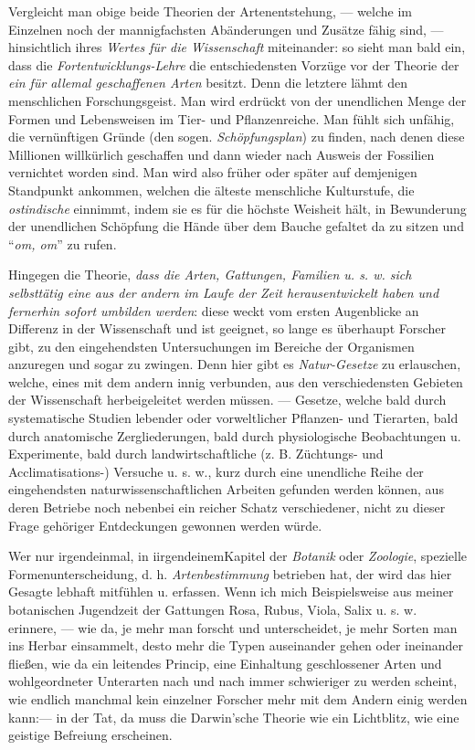 \documentclass[a4paper, 11pt, oneside, english]{article}
\begin{document}
Vergleicht man obige beide Theorien der Artenentstehung, --- welche im Einzelnen noch der mannigfachsten Abänderungen und Zusätze fähig sind, --- hinsichtlich ihres \emph{Wertes für die Wissenschaft} miteinander: so sieht man bald ein, dass die \emph{Fortentwicklungs-Lehre} die entschiedensten Vorzüge vor der Theorie der \emph{ein für allemal geschaffenen Arten} besitzt. Denn die letztere lähmt den menschlichen Forschungsgeist. Man wird erdrückt von der unendlichen Menge der Formen und Lebensweisen im Tier- und Pflanzenreiche. Man fühlt sich unfähig, die vernünftigen Gründe (den sogen. \emph{Schöpfungsplan}) zu finden, nach denen diese Millionen willkürlich geschaffen und dann wieder nach Ausweis der Fossilien vernichtet worden sind. Man wird also früher oder später auf demjenigen Standpunkt ankommen, welchen die älteste menschliche Kulturstufe, die \emph{ostindische} einnimmt, indem sie es für die höchste Weisheit hält, in Bewunderung der unendlichen Schöpfung die Hände über dem Bauche gefaltet da zu sitzen und "`\emph{om, om}"' zu rufen.

Hingegen die Theorie, \emph{dass die Arten, Gattungen, Familien u. s. w. sich selbsttätig eine aus der andern im Laufe der Zeit herausentwickelt haben und fernerhin sofort umbilden werden}: diese weckt vom ersten Augenblicke an Differenz in der Wissenschaft und ist geeignet, so lange es überhaupt Forscher gibt, zu den eingehendsten Untersuchungen im Bereiche der Organismen anzuregen und sogar zu zwingen. Denn hier gibt es \emph{Natur-Gesetze} zu erlauschen, welche, eines mit dem andern innig verbunden, aus den verschiedensten Gebieten der Wissenschaft herbeigeleitet werden müssen. --- Gesetze, welche bald durch systematische Studien lebender oder vorweltlicher Pflanzen- und Tierarten, bald durch anatomische Zergliederungen, bald durch physiologische Beobachtungen u. Experimente, bald durch landwirtschaftliche (z. B. Züchtungs- und Acclimatisations-) Versuche u. s. w., kurz durch eine unendliche Reihe der eingehendsten naturwissenschaftlichen Arbeiten gefunden werden können, aus deren Betriebe noch nebenbei ein reicher Schatz verschiedener, nicht zu dieser Frage gehöriger Entdeckungen gewonnen werden würde.

Wer nur irgendeinmal, in iirgendeinemKapitel der \emph{Botanik} oder \emph{Zoologie}, spezielle Formenunterscheidung, d. h. \emph{Artenbestimmung} betrieben hat, der wird das hier Gesagte lebhaft mitfühlen u. erfassen. Wenn ich mich Beispielsweise aus meiner botanischen Jugendzeit der Gattungen Rosa, Rubus, Viola, Salix u. s. w. erinnere, --- wie da, je mehr man forscht und unterscheidet, je mehr Sorten man ins Herbar einsammelt, desto mehr die Typen auseinander gehen oder ineinander fließen, wie da ein leitendes Princip, eine Einhaltung geschlossener Arten und wohlgeordneter Unterarten nach und nach immer schwieriger zu werden scheint, wie endlich manchmal kein einzelner Forscher mehr mit dem Andern einig werden kann:--- in der Tat, da muss die Darwin'sche Theorie wie ein Lichtblitz, wie eine geistige Befreiung erscheinen.
\end{document}
